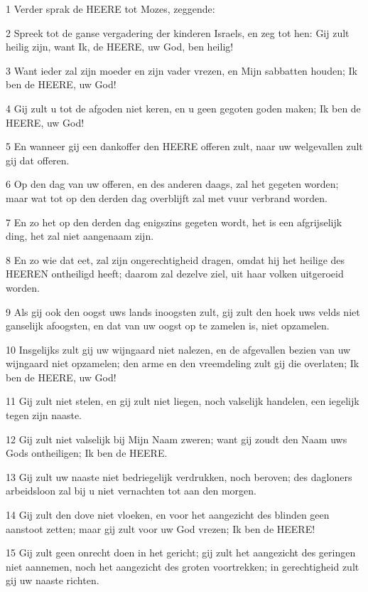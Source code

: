 \par 1 Verder sprak de HEERE tot Mozes, zeggende:
\par 2 Spreek tot de ganse vergadering der kinderen Israels, en zeg tot hen: Gij zult heilig zijn, want Ik, de HEERE, uw God, ben heilig!
\par 3 Want ieder zal zijn moeder en zijn vader vrezen, en Mijn sabbatten houden; Ik ben de HEERE, uw God!
\par 4 Gij zult u tot de afgoden niet keren, en u geen gegoten goden maken; Ik ben de HEERE, uw God!
\par 5 En wanneer gij een dankoffer den HEERE offeren zult, naar uw welgevallen zult gij dat offeren.
\par 6 Op den dag van uw offeren, en des anderen daags, zal het gegeten worden; maar wat tot op den derden dag overblijft zal met vuur verbrand worden.
\par 7 En zo het op den derden dag enigszins gegeten wordt, het is een afgrijselijk ding, het zal niet aangenaam zijn.
\par 8 En zo wie dat eet, zal zijn ongerechtigheid dragen, omdat hij het heilige des HEEREN ontheiligd heeft; daarom zal dezelve ziel, uit haar volken uitgeroeid worden.
\par 9 Als gij ook den oogst uws lands inoogsten zult, gij zult den hoek uws velds niet ganselijk afoogsten, en dat van uw oogst op te zamelen is, niet opzamelen.
\par 10 Insgelijks zult gij uw wijngaard niet nalezen, en de afgevallen bezien van uw wijngaard niet opzamelen; den arme en den vreemdeling zult gij die overlaten; Ik ben de HEERE, uw God!
\par 11 Gij zult niet stelen, en gij zult niet liegen, noch valselijk handelen, een iegelijk tegen zijn naaste.
\par 12 Gij zult niet valselijk bij Mijn Naam zweren; want gij zoudt den Naam uws Gods ontheiligen; Ik ben de HEERE.
\par 13 Gij zult uw naaste niet bedriegelijk verdrukken, noch beroven; des dagloners arbeidsloon zal bij u niet vernachten tot aan den morgen.
\par 14 Gij zult den dove niet vloeken, en voor het aangezicht des blinden geen aanstoot zetten; maar gij zult voor uw God vrezen; Ik ben de HEERE!
\par 15 Gij zult geen onrecht doen in het gericht; gij zult het aangezicht des geringen niet aannemen, noch het aangezicht des groten voortrekken; in gerechtigheid zult gij uw naaste richten.
